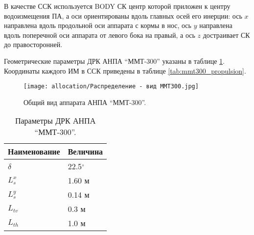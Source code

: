 В качестве ССК используется BODY СК \cite{fossen2011handbook} центр которой приложен к центру водоизмещения ПА, а оси ориентированы вдоль главных осей его инерции: ось $x$ направлена вдоль продольной оси аппарата с кормы в нос, ось $y$ направлена вдоль поперечной оси аппарата от левого бока на правый, а ось $z$ достраивает СК до правосторонней.

Геометрические параметры ДРК АНПА ``ММТ-300'' указаны в таблице \ref{tab:mmt300_propulsion_param}.
Координаты каждого ИМ в ССК приведены в таблице \ref{tab:mmt300_propulsion}.

\begin{figure}[ht]
    \centering
    \texttt{[image: allocation/Распределение - вид ММТ300.jpg]}
    \caption{Общий вид аппарата АНПА ``ММТ-300''.}
    \label{fig:mmt-300}
\end{figure}

\begin{table}
    \caption{Параметры ДРК АНПА ``ММТ-300''.}
    \label{tab:mmt300_propulsion_param}
    \centering
    \begin{tabular}{ll}
        \toprule
        Наименование & Величина \\ 
        \midrule
        $\delta$ & 22.5$^{\circ}$ \\
        $L_s^x$ & 1.60 м \\
        $L_s^y$ & 0.14 м \\
        $L_{tv}$ & 0.3 м \\
        $L_{th}$ & 1.0 м \\
        \bottomrule
    \end{tabular}
\end{table}

